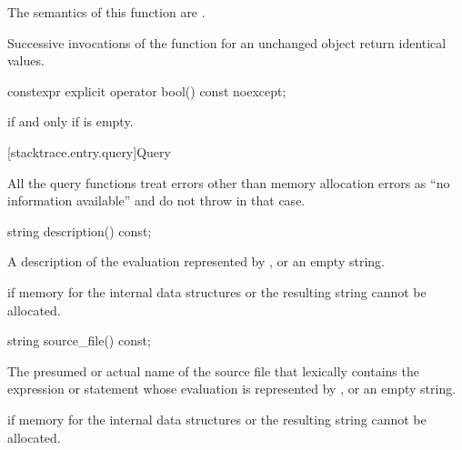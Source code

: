 \begin{itemdescr}
\pnum
The semantics of this function are
.

\pnum
\remarks
Successive invocations of the  function
for an unchanged  object return identical values.
\end{itemdescr}

%
\begin{itemdecl}
constexpr explicit operator bool() const noexcept;
\end{itemdecl}

\begin{itemdescr}
\pnum
\returns
{} if and only if  is empty.
\end{itemdescr}

[stacktrace.entry.query]{Query}

\pnum
\begin{note}
All the  query functions treat
errors other than memory allocation errors
as ``no information available'' and do not throw in that case.
\end{note}

%
\begin{itemdecl}
string description() const;
\end{itemdecl}

\begin{itemdescr}
\pnum
\returns
A description of the evaluation represented by ,
or an empty string.

\pnum
\throws
{} if memory for
the internal data structures or the resulting string cannot be allocated.
\end{itemdescr}

%
\begin{itemdecl}
string source_file() const;
\end{itemdecl}

\begin{itemdescr}
\pnum
\returns
The presumed or actual name of the source file
that lexically contains the expression or statement
whose evaluation is represented by , or an empty string.

\pnum
\throws
{} if memory for
the internal data structures or the resulting string cannot be allocated.
\end{itemdescr}

